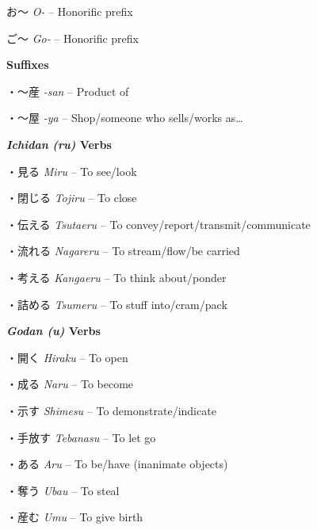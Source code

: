 \par{お～  \emph{O- }– Honorific prefix }
 
\par{ご～  \emph{Go- }– Honorific prefix }
 
\par{\textbf{Suffixes }}
 
\par{・～産  \emph{-san }– Product of }
 
\par{・～屋  \emph{-ya }– Shop\slash someone who sells\slash works as… }
 
\par{\textbf{\emph{Ichidan } \emph{(ru) }Verbs }}
 
\par{・見る  \emph{Miru }– To see\slash look }
 
\par{・閉じる  \emph{Tojiru }– To close }
 
\par{・伝える \emph{Tsutaeru }– To convey\slash report\slash transmit\slash communicate }
 
\par{・流れる  \emph{Nagareru }– To stream\slash flow\slash be carried }
 
\par{・考える  \emph{Kangaeru }– To think about\slash ponder }
 
\par{・詰める  \emph{Tsumeru }– To stuff into\slash cram\slash pack }
 
\par{\textbf{\emph{Godan (u) }Verbs }}
 
\par{・開く  \emph{Hiraku }– To open }
 
\par{・成る  \emph{Naru }– To become }
 
\par{・示す  \emph{Shimesu }– To demonstrate\slash indicate }
 
\par{・手放す  \emph{Tebanasu }– To let go }
 
\par{・ある  \emph{Aru }– To be\slash have (inanimate objects) }
 
\par{・奪う  \emph{Ubau }– To steal }
 
\par{・産む  \emph{Umu }– To give birth }
 
